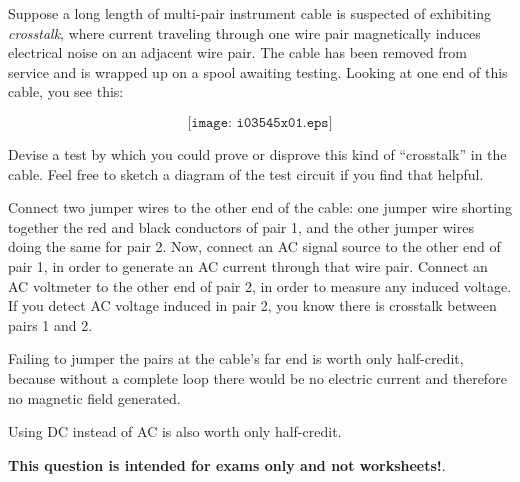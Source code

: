

Suppose a long length of multi-pair instrument cable is suspected of exhibiting {\it crosstalk}, where current traveling through one wire pair magnetically induces electrical noise on an adjacent wire pair.  The cable has been removed from service and is wrapped up on a spool awaiting testing.  Looking at one end of this cable, you see this:

$$\texttt{[image: i03545x01.eps]}$$

Devise a test by which you could prove or disprove this kind of ``crosstalk'' in the cable.  Feel free to sketch a diagram of the test circuit if you find that helpful.







Connect two jumper wires to the other end of the cable: one jumper wire shorting together the red and black conductors of pair 1, and the other jumper wires doing the same for pair 2.  Now, connect an AC signal source to the other end of pair 1, in order to generate an AC current through that wire pair.  Connect an AC voltmeter to the other end of pair 2, in order to measure any induced voltage.  If you detect AC voltage induced in pair 2, you know there is crosstalk between pairs 1 and 2. 

\vskip 10pt

Failing to jumper the pairs at the cable's far end is worth only half-credit, because without a complete loop there would be no electric current and therefore no magnetic field generated.

\vskip 10pt

Using DC instead of AC is also worth only half-credit.







{\bf This question is intended for exams only and not worksheets!}.



